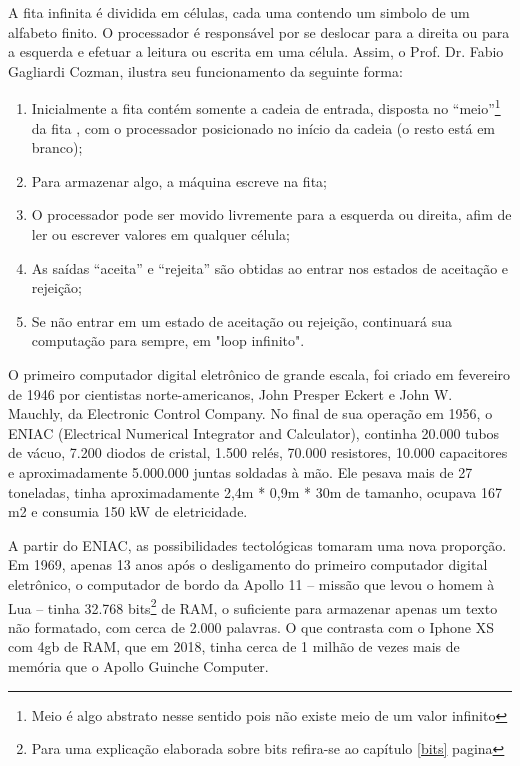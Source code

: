 A fita infinita é dividida em células, cada uma contendo um simbolo de um alfabeto finito. O processador é responsável por se deslocar para a direita ou para a esquerda e efetuar a leitura ou escrita em uma célula. Assim, o Prof. Dr. Fabio Gagliardi Cozman\cite{7}, ilustra seu funcionamento da seguinte forma:
\begin{enumerate}
  \item Inicialmente a fita contém somente a cadeia de entrada, disposta no “meio”\footnote{Meio é algo abstrato nesse sentido pois não existe meio de um valor infinito} da fita , com o processador posicionado no início da cadeia (o resto está em branco);
  \item Para armazenar algo, a máquina escreve na fita;
  \item O processador pode ser movido livremente para a esquerda ou direita, afim de ler ou escrever valores em qualquer célula;
  \item As saídas ``aceita'' e ``rejeita'' são obtidas ao entrar nos estados de aceitação e rejeição;
  \item Se não entrar em um estado de aceitação ou rejeição, continuará sua computação para sempre, em  "loop infinito".
\end{enumerate}

O primeiro computador digital eletrônico de grande escala, foi criado em fevereiro de 1946 por cientistas norte-americanos, John Presper Eckert e John W. Mauchly, da Electronic Control Company. No final de sua operação em 1956, o ENIAC (Electrical Numerical Integrator and Calculator), continha 20.000 tubos de vácuo, 7.200 diodos de cristal, 1.500 relés, 70.000 resistores, 10.000 capacitores e aproximadamente 5.000.000 juntas soldadas à mão. Ele pesava mais de 27 toneladas, tinha aproximadamente 2,4m * 0,9m * 30m de tamanho, ocupava 167 m2 e consumia 150 kW de eletricidade. \cite{2}

A partir do ENIAC, as possibilidades tectológicas tomaram uma nova proporção. Em 1969, apenas 13 anos após o desligamento do primeiro computador digital eletrônico, o computador de bordo da Apollo 11 – missão que levou o homem  à Lua – tinha 32.768 bits\footnote{Para uma explicação elaborada sobre bits refira-se ao capítulo \ref{bits} pagina \pageref{bits}} de RAM, o suficiente para armazenar apenas um texto não formatado, com cerca de 2.000 palavras. O que contrasta com o Iphone XS com 4gb de RAM, que em 2018, tinha cerca de 1 milhão de vezes mais de memória que o Apollo Guinche Computer. \cite{5}

